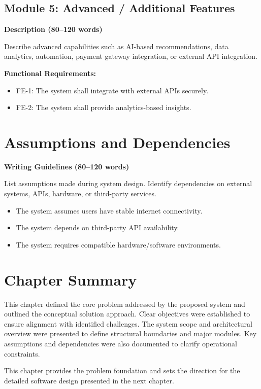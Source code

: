\subsection{Module 5: Advanced / Additional Features}

\textbf{Description (80–120 words)}

Describe advanced capabilities such as AI-based recommendations, 
data analytics, automation, payment gateway integration, or external 
API integration.

\textbf{Functional Requirements:}

\begin{itemize}
    \item FE-1: The system shall integrate with external APIs securely.
    \item FE-2: The system shall provide analytics-based insights.
\end{itemize}



\section{Assumptions and Dependencies}

\textbf{Writing Guidelines (80–120 words)}

List assumptions made during system design. Identify dependencies 
on external systems, APIs, hardware, or third-party services.

\begin{itemize}
    \item The system assumes users have stable internet connectivity.
    \item The system depends on third-party API availability.
    \item The system requires compatible hardware/software environments.
\end{itemize}

\section{Chapter Summary}

This chapter defined the core problem addressed by the proposed system and 
outlined the conceptual solution approach. Clear objectives were established 
to ensure alignment with identified challenges. The system scope and 
architectural overview were presented to define structural boundaries 
and major modules. Key assumptions and dependencies were also documented 
to clarify operational constraints. 

This chapter provides the problem foundation and sets the direction for 
the detailed software design presented in the next chapter.
